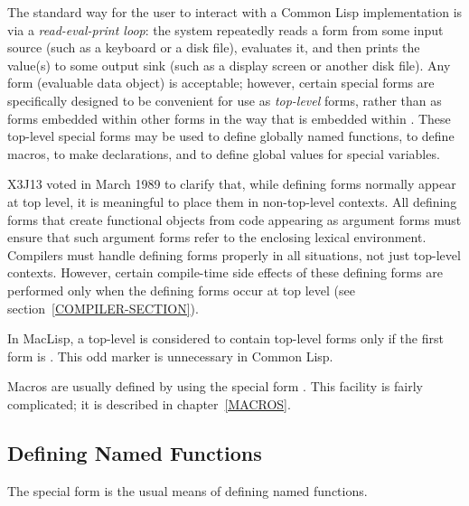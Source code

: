 The standard way for the user to interact with a Common Lisp implementation is
via a \emph{read-eval-print loop}: the system repeatedly
reads a form from some input source (such as a keyboard or a disk file),
evaluates it, and then prints the value(s) to some output sink (such as a
display screen or another disk file).  Any form (evaluable
data object) is acceptable; however, certain special forms are specifically
designed to be convenient for use as \emph{top-level} forms,
rather than as forms embedded within other forms in the way
that 
is embedded within .
These top-level special forms may be used to define globally named
functions, to define macros, to make declarations,
and to define global values for special variables.

\newpage%

\begin{newer}
X3J13 voted in March 1989 
to clarify that, while defining forms normally appear at top level,
it is meaningful to place them in non-top-level contexts.
All defining forms that create functional objects from code appearing
as argument forms must ensure that
such argument forms refer to the enclosing lexical environment.
Compilers must handle defining forms properly in all situations,
not just top-level contexts.  However, certain
compile-time side effects of these defining forms are performed only
when the defining forms occur at top level (see section~\ref{COMPILER-SECTION}).
\end{newer}

\beforenoterule
\begin{incompatibility}
In MacLisp, a top-level  is considered to
contain top-level forms only if the first form is .
This odd marker is unnecessary in Common Lisp.
\end{incompatibility}
\afternoterule

Macros are usually defined by using the special form .
This facility is fairly complicated; it is described in chapter~\ref{MACROS}.

\subsection{Defining Named Functions}

The  special form is the usual means of defining named functions.

